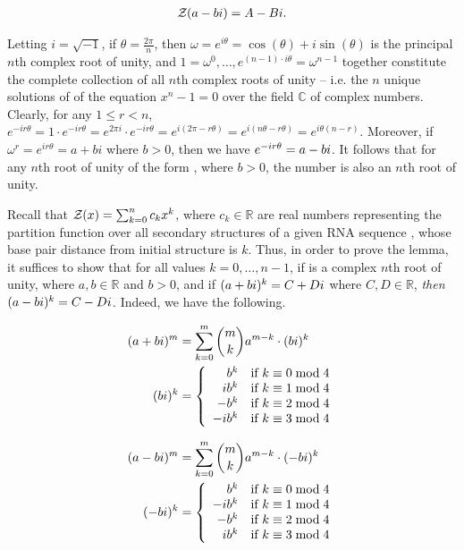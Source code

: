 \begin{align}
{\mathcal Z}_{}(a-bi) = A - Bi.
\end{align}

 Letting $i = \sqrt{-1}$, if
$\theta = \frac{2 \pi}{n}$, then
$\omega = e^{i \theta} = \cos(\theta) + i \sin(\theta)$
is the principal $n$th complex root of unity, and
$1=\omega^{0},\dots,e^{(n-1)\cdot i \theta}=\omega^{n-1}$ together
constitute the complete collection of all
$n$th complex roots of unity -- i.e. the $n$ unique solutions of
of the equation $x^n -1 = 0$ over the field $\mathbb{C}$ of complex numbers.
Clearly, for any $1 \leq r < n$,
$e^{-i r \theta} = 1 \cdot e^{-i r \theta} =
e^{2 \pi i} \cdot e^{-i r \theta} = e^{i(2 \pi - r \theta)} =
e^{i(n \theta - r \theta)} = e^{i \theta (n - r)}$.
Moreover, if $\omega^r = e^{i r \theta} = a + b i$ where
$b>0$, then we have $e^{-i r \theta} = a-bi$. It follows that for any
$n$th root of unity of the form \aPbi, where $b>0$, the number \aMbi
is also an $n$th root of unity.

Recall that ${\mathcal Z}_{}(x) = \sum_{k=0}^n c_k x^k$, where
$c_k\in \mathbb{R}$ are real numbers representing the partition function
 over
all secondary structures of a given RNA sequence \seqN,
whose base pair distance from initial structure
\strSt is $k$. Thus, in order to prove the lemma, it suffices to show
that for all values $k=0,\dots,n-1$, if \aPbi is a complex $n$th
root of unity, where $a,b \in \mathbb{R}$
and $b>0$, and if $(a+bi)^k = C+Di$ where $C,D \in \mathbb{R}$, {\em then}
$(a-bi)^k = C-Di$. Indeed, we have the following.

\begin{align}
(a+bi)^m &= \sum_{k=0}^m {m \choose k} a^{m-k}\cdot (bi)^k \\
(bi)^k  &= \left\{
\begin{array}{rl}
b^k &\mbox{if $k \equiv 0 \bmod 4$}\\
i b^k &\mbox{if $k \equiv 1 \bmod 4$}\\
-b^k &\mbox{if $k \equiv 2 \bmod 4$}\\
-i b^k &\mbox{if $k \equiv 3 \bmod 4$}\\
\end{array} \right.
\end{align}

\begin{align}
(a-bi)^m &= \sum_{k=0}^m {m \choose k} a^{m-k} \cdot (-bi)^k \\
(-bi)^k &= \left\{
\begin{array}{rl}
b^k &\mbox{if $k \equiv 0 \bmod 4$}\\
-ib^k &\mbox{if $k \equiv 1 \bmod 4$}\\
-b^k &\mbox{if $k \equiv 2 \bmod 4$}\\
ib^k &\mbox{if $k \equiv 3 \bmod 4$}\\
\end{array} \right.
\end{align}

